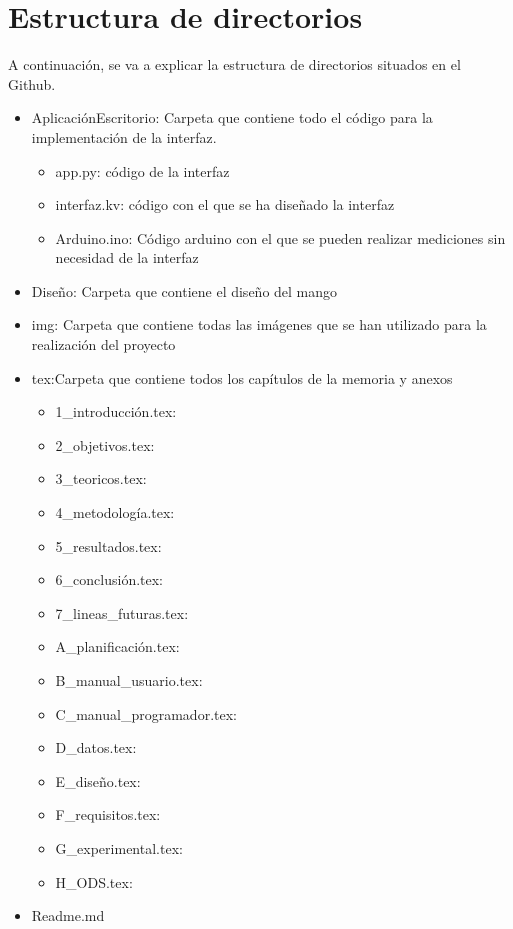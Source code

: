 \section{Estructura de directorios}
A continuación, se va a explicar la estructura de directorios situados en el Github.
\begin{itemize}
    \item AplicaciónEscritorio: Carpeta que contiene todo el código para la implementación de la interfaz.
    \begin{itemize}
        \item app.py: código de la interfaz
        \item interfaz.kv: código con el que se ha diseñado la interfaz
        \item Arduino.ino: Código arduino con el que se pueden realizar mediciones sin necesidad de la interfaz
    \end{itemize}
    \item Diseño: Carpeta que contiene el diseño del mango
    \item img: Carpeta que contiene todas las imágenes que se han utilizado para la realización del proyecto 
    \item tex:Carpeta que contiene todos los capítulos de la memoria y anexos
    \begin{itemize}
        \item 1\_introducción.tex:
        \item 2\_objetivos.tex:
        \item 3\_teoricos.tex:
        \item 4\_metodología.tex:
        \item 5\_resultados.tex:
        \item 6\_conclusión.tex:
        \item 7\_lineas\_futuras.tex:
        \item A\_planificación.tex:
        \item B\_manual\_usuario.tex:
        \item C\_manual\_programador.tex:
        \item D\_datos.tex:
        \item E\_diseño.tex:
        \item F\_requisitos.tex:
        \item G\_experimental.tex:
        \item H\_ODS.tex:
    \end{itemize}
    \item Readme.md

\end{itemize}
